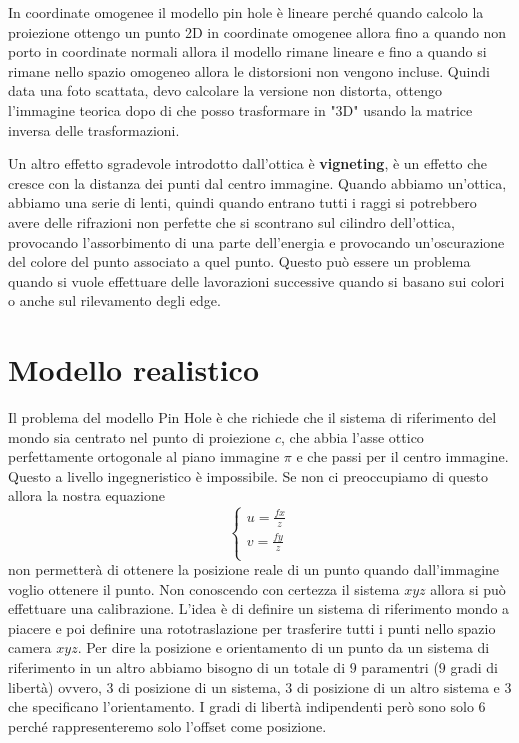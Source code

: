 \begin{nota}
    In coordinate omogenee il modello pin hole è lineare perché quando calcolo 
    la proiezione ottengo un punto 2D in coordinate omogenee allora fino a quando 
    non porto in coordinate normali allora il modello rimane lineare e fino a quando 
    si rimane nello spazio omogeneo allora le distorsioni non vengono incluse.
    Quindi data una foto scattata, devo calcolare la versione non distorta, ottengo 
    l'immagine teorica dopo di che posso trasformare in "3D" usando la matrice inversa 
    delle trasformazioni.
\end{nota}

Un altro effetto sgradevole introdotto dall'ottica è \textbf{vigneting}, è un 
effetto che cresce con la distanza dei punti dal centro immagine. Quando abbiamo 
un'ottica, abbiamo una serie di lenti, quindi quando entrano tutti i raggi si potrebbero 
avere delle rifrazioni non perfette che si scontrano sul cilindro dell'ottica,
provocando l'assorbimento di una parte dell'energia e provocando un'oscurazione del
colore del punto associato a quel punto. Questo può essere un problema quando si 
vuole effettuare delle lavorazioni successive quando si basano sui colori o anche 
sul rilevamento degli edge.

\section{Modello realistico}
Il problema del modello Pin Hole è che richiede che il sistema di riferimento del 
mondo sia centrato nel punto di proiezione $c$, che abbia l'asse ottico perfettamente
ortogonale al piano immagine $\pi$ e che passi per il centro immagine. Questo a 
livello ingegneristico è impossibile. Se non ci preoccupiamo di questo allora 
la nostra equazione 
$$\begin{cases}
    u= \frac{fx}{z}\\
    v= \frac{fy}{z}\\
\end{cases}$$
non permetterà di ottenere la posizione reale di un punto quando dall'immagine voglio
ottenere il punto. Non conoscendo con certezza il sistema $xyz$ allora si può 
effettuare una calibrazione. L'idea è di definire un sistema di riferimento mondo 
a piacere e poi definire una rototraslazione per trasferire tutti i punti nello 
spazio camera $xyz$. Per dire la posizione e orientamento di un punto da un sistema di riferimento 
in un altro abbiamo bisogno di un totale di $9$ paramentri ($9$ gradi di libertà)
ovvero, $3$ di posizione di un sistema, $3$ di posizione di un altro sistema 
e $3$ che specificano l'orientamento. I gradi di libertà indipendenti però sono solo 
$6$ perché rappresenteremo solo l'offset come posizione.


